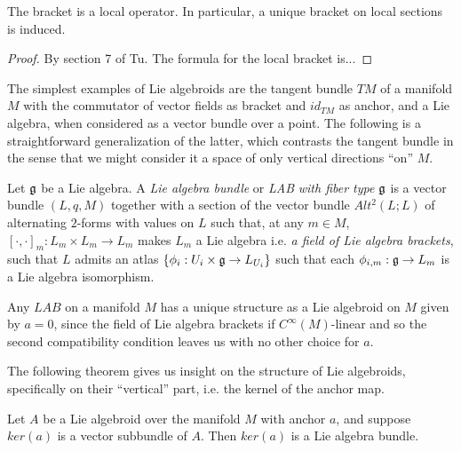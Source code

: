 \begin{lemma}\label{lemmaSectionLocal}
The bracket is a local operator. In particular, a unique bracket on local sections is induced.
\end{lemma}

\begin{proof}
By section 7 of Tu. The formula for the local bracket is... 
\end{proof}

The simplest examples of Lie algebroids are the tangent bundle $TM$ of a manifold $M$ with the commutator of vector fields as bracket and $id_{TM}$ as anchor, and a Lie algebra, when considered as a vector bundle over a point. The following is a straightforward generalization of the latter, which contrasts the tangent bundle in the sense that we might consider it a space of only vertical directions ``on'' $M$.

\begin{definition}
    Let $\mathfrak{g}$ be a Lie algebra. A \emph{Lie algebra bundle} or \emph{LAB} \emph{with fiber type $\mathfrak{g}$} is a vector bundle $(L, q, M)$ together with a section of the vector bundle $Alt^2(L; L)$ of alternating $2$-forms with values on $L$ such that, at any $m \in M$, $[\cdot, \cdot]_m:L_m \times L_m \to L_m$ makes $L_m$ a Lie algebra i.e. \emph{a field of Lie algebra brackets}, such that $L$ admits an atlas $\set{\phi_i: U_i \times \alg g \to L_{U_i}}$ such that each $\phi_{i, m}: \alg g \to L_m$ is a Lie algebra isomorphism. 
\end{definition}

Any $LAB$ on a manifold $M$ has a unique structure as a Lie algebroid on $M$ given by $a = 0$, since the field of Lie algebra brackets if $C^\infty(M)$-linear and so the second compatibility condition leaves us with no other choice for $a$.

The following theorem gives us insight on the structure of Lie algebroids, specifically on their ``vertical'' part, i.e. the kernel of the anchor map.

\begin{theorem} \label{theoFiberLie}
Let $A$ be a Lie algebroid over the manifold $M$ with anchor $a$, and suppose $ker(a)$ is a vector subbundle of $A$. Then $ker(a)$ %
is a Lie algebra bundle.
\end{theorem}

